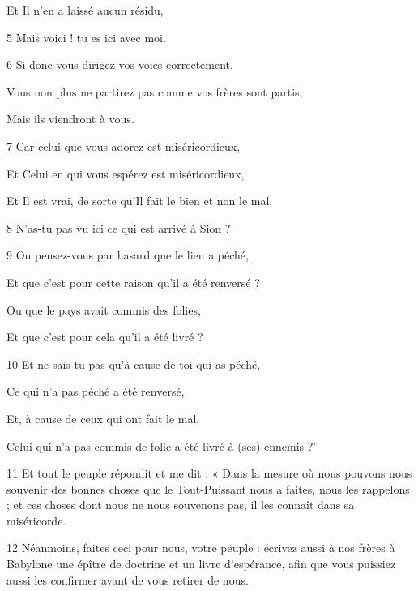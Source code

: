 \par Et Il n’en a laissé aucun résidu,

\par 5 Mais voici ! tu es ici avec moi.

\par 6 Si donc vous dirigez vos voies correctement,

\par Vous non plus ne partirez pas comme vos frères sont partis,

\par Mais ils viendront à vous.

\par 7 Car celui que vous adorez est miséricordieux,

\par Et Celui en qui vous espérez est miséricordieux,

\par Et Il est vrai, de sorte qu'Il fait le bien et non le mal.

\par 8 N'as-tu pas vu ici ce qui est arrivé à Sion ?

\par 9 Ou pensez-vous par hasard que le lieu a péché,

\par Et que c'est pour cette raison qu'il a été renversé ?

\par Ou que le pays avait commis des folies,

\par Et que c'est pour cela qu'il a été livré ?

\par 10 Et ne sais-tu pas qu'à cause de toi qui as péché,

\par Ce qui n'a pas péché a été renversé,

\par Et, à cause de ceux qui ont fait le mal,

\par Celui qui n'a pas commis de folie a été livré à (ses) ennemis ?'

\par 11 Et tout le peuple répondit et me dit : « Dans la mesure où nous pouvons nous souvenir des bonnes choses que le Tout-Puissant nous a faites, nous les rappelons ; et ces choses dont nous ne nous souvenons pas, il les connaît dans sa miséricorde.

\par 12 Néanmoins, faites ceci pour nous, votre peuple : écrivez aussi à nos frères à Babylone une épître de doctrine et un livre d'espérance, afin que vous puissiez aussi les confirmer avant de vous retirer de nous.

